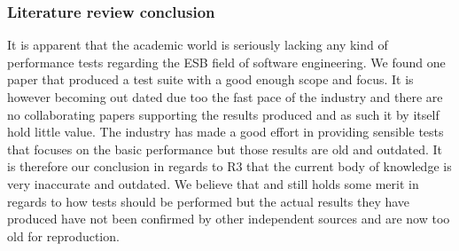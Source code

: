\subsubsection{Literature review conclusion}

It is apparent that the academic world is seriously lacking any kind of performance tests regarding the ESB field of software engineering. We found one paper\cite{Sanjay2011} that produced a test suite with a good enough scope and focus. It is however becoming out dated due too the fast pace of the industry and there are no collaborating papers supporting the results produced and as such it by itself hold little value. The industry has made a good effort in providing sensible tests that focuses on the basic performance but those results are old and outdated. 
It is therefore our conclusion in regards to R3 that the current body of knowledge is very inaccurate and outdated. We believe that \cite{Sanjay2011} and \cite{Perera07,Perera07R2,Perera07R3,mulesoft08}still holds some merit in regards to how tests should be performed but the actual results they have produced have not been confirmed by other independent sources and are now too old for reproduction.
